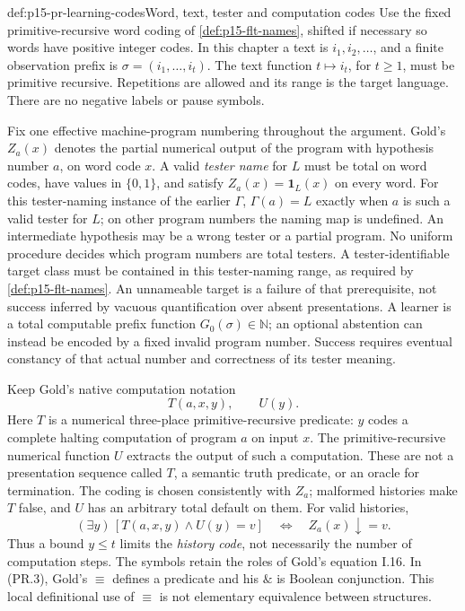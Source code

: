 \begin{hbconvention}{def:p15-pr-learning-codes}{Word, text, tester and computation codes}
Use the fixed primitive-recursive word coding of
\cref{def:p15-flt-names}, shifted if necessary so words have positive
integer codes. In this chapter a text is
\(i_1,i_2,\ldots\), and a finite observation prefix is
\(\sigma=(i_1,\ldots,i_t)\).
The text function \(t\mapsto i_t\), for \(t\geq1\), must be
primitive recursive. Repetitions are allowed and its range is the
target language. There are no negative labels or pause symbols.

Fix one effective machine-program numbering throughout the argument.
Gold's \(Z_a(x)\) denotes the partial numerical output of the program
with hypothesis number \(a\), on word code \(x\).
A valid \emph{tester name} for \(L\) must be total on word codes, have values in
\(\{0,1\}\), and satisfy \(Z_a(x)=\mathbf1_L(x)\) on every word.
For this tester-naming instance of the earlier \(\Gamma\),
\(\Gamma(a)=L\) exactly when \(a\) is such a valid tester for \(L\);
on other program numbers the naming map is undefined.
An intermediate hypothesis may be a wrong tester or a partial program.
No uniform procedure decides which program numbers are total testers.
A tester-identifiable target class must be contained in this
tester-naming range, as required by \cref{def:p15-flt-names}.
An unnameable target is a failure of that prerequisite, not success
inferred by vacuous quantification over absent presentations.
A learner is a total computable prefix function
\(G_0(\sigma)\in\mathbb N\); an optional abstention can instead be
encoded by a fixed invalid program number.
Success requires eventual constancy of that actual number and
correctness of its tester meaning.

Keep Gold's native computation notation
\[
 T(a,x,y),\qquad U(y).
\]
Here \(T\) is a numerical three-place primitive-recursive predicate:
\(y\) codes a complete halting computation of program \(a\) on input
\(x\). The primitive-recursive numerical function \(U\) extracts the
output of such a computation. These are not a presentation sequence
called \(T\), a semantic truth predicate, or an oracle for termination.
The coding is chosen consistently with \(Z_a\); malformed histories
make \(T\) false, and \(U\) has an arbitrary total default on them.
For valid histories,
\[
 (\exists y)\,[T(a,x,y)\land U(y)=v]
 \quad\Longleftrightarrow\quad Z_a(x)\downarrow=v.
 \tag{PR.1}
\]
Thus a bound \(y\leq t\) limits the \emph{history code}, not necessarily
the number of computation steps.
The symbols retain the roles of Gold's equation I.16.
In (PR.3), Gold's \(\equiv\) defines a predicate and his
\(\&\) is Boolean conjunction. This local definitional use of
\(\equiv\) is not elementary equivalence between structures.
\end{hbconvention}


